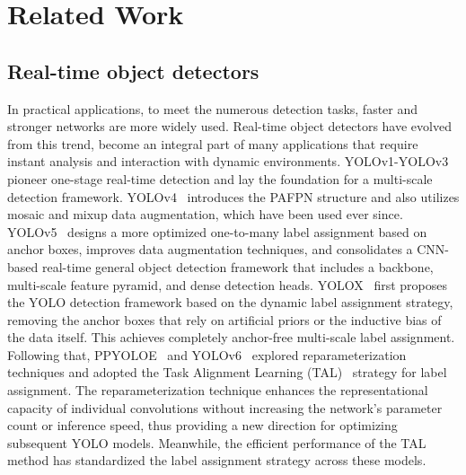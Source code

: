 \section{Related Work}
\subsection{Real-time object detectors}
In practical applications, to meet the numerous detection tasks, faster and stronger networks are more widely used. Real-time object detectors have evolved from this trend, become an integral part of many applications that require instant analysis and interaction with dynamic environments. YOLOv1-YOLOv3~\cite{yolo1,yolo9000,yolov3} pioneer one-stage real-time detection and lay the foundation for a multi-scale detection framework. YOLOv4~\cite{yolov4} introduces the PAFPN structure and also utilizes mosaic and mixup data augmentation, which have been used ever since. YOLOv5~\cite{yolov5} designs a more optimized one-to-many label assignment based on anchor boxes, improves data augmentation techniques, and consolidates a CNN-based real-time general object detection framework that includes a backbone, multi-scale feature pyramid, and dense detection heads. YOLOX~\cite{yolox} first proposes the YOLO detection framework based on the dynamic label assignment strategy, removing the anchor boxes that rely on artificial priors or the inductive bias of the data itself. This achieves completely anchor-free multi-scale label assignment. 
Following that, PPYOLOE~\cite{ppyoloe} and YOLOv6~\cite{yolov6} explored reparameterization techniques and adopted the Task Alignment Learning (TAL)~\cite{tal} strategy for label assignment. The reparameterization technique enhances the representational capacity of individual convolutions without increasing the network’s parameter count or inference speed, thus providing a new direction for optimizing subsequent YOLO models. Meanwhile, the efficient performance of the TAL method has standardized the label assignment strategy across these models.
